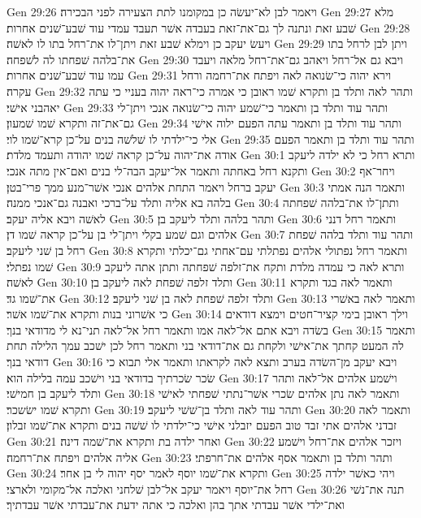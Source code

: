 Gen 29:26  ויאמר לבן לא־יעשׂה כן במקומנו לתת הצעירה לפני הבכירה׃
Gen 29:27  מלא שׁבע זאת ונתנה לך גם־את־זאת בעבדה אשׁר תעבד עמדי עוד שׁבע־שׁנים אחרות׃
Gen 29:28  ויעשׂ יעקב כן וימלא שׁבע זאת ויתן־לו את־רחל בתו לו לאשׁה׃
Gen 29:29  ויתן לבן לרחל בתו את־בלהה שׁפחתו לה לשׁפחה׃
Gen 29:30  ויבא גם אל־רחל ויאהב גם־את־רחל מלאה ויעבד עמו עוד שׁבע־שׁנים אחרות׃
Gen 29:31  וירא יהוה כי־שׂנואה לאה ויפתח את־רחמה ורחל עקרה׃
Gen 29:32  ותהר לאה ותלד בן ותקרא שׁמו ראובן כי אמרה כי־ראה יהוה בעניי כי עתה יאהבני אישׁי׃
Gen 29:33  ותהר עוד ותלד בן ותאמר כי־שׁמע יהוה כי־שׂנואה אנכי ויתן־לי גם־את־זה ותקרא שׁמו שׁמעון׃
Gen 29:34  ותהר עוד ותלד בן ותאמר עתה הפעם ילוה אישׁי אלי כי־ילדתי לו שׁלשׁה בנים על־כן קרא־שׁמו לוי׃
Gen 29:35  ותהר עוד ותלד בן ותאמר הפעם אודה את־יהוה על־כן קראה שׁמו יהודה ותעמד מלדת׃
Gen 30:1  ותרא רחל כי לא ילדה ליעקב ותקנא רחל באחתה ותאמר אל־יעקב הבה־לי בנים ואם־אין מתה אנכי׃
Gen 30:2  ויחר־אף יעקב ברחל ויאמר התחת אלהים אנכי אשׁר־מנע ממך פרי־בטן׃
Gen 30:3  ותאמר הנה אמתי בלהה בא אליה ותלד על־ברכי ואבנה גם־אנכי ממנה׃
Gen 30:4  ותתן־לו את־בלהה שׁפחתה לאשׁה ויבא אליה יעקב׃
Gen 30:5  ותהר בלהה ותלד ליעקב בן׃
Gen 30:6  ותאמר רחל דנני אלהים וגם שׁמע בקלי ויתן־לי בן על־כן קראה שׁמו דן׃
Gen 30:7  ותהר עוד ותלד בלהה שׁפחת רחל בן שׁני ליעקב׃
Gen 30:8  ותאמר רחל נפתולי אלהים נפתלתי עם־אחתי גם־יכלתי ותקרא שׁמו נפתלי׃
Gen 30:9  ותרא לאה כי עמדה מלדת ותקח את־זלפה שׁפחתה ותתן אתה ליעקב לאשׁה׃
Gen 30:10  ותלד זלפה שׁפחת לאה ליעקב בן׃
Gen 30:11  ותאמר לאה בגד ותקרא את־שׁמו גד׃
Gen 30:12  ותלד זלפה שׁפחת לאה בן שׁני ליעקב׃
Gen 30:13  ותאמר לאה באשׁרי כי אשׁרוני בנות ותקרא את־שׁמו אשׁר׃
Gen 30:14  וילך ראובן בימי קציר־חטים וימצא דודאים בשׂדה ויבא אתם אל־לאה אמו ותאמר רחל אל־לאה תני־נא לי מדודאי בנך׃
Gen 30:15  ותאמר לה המעט קחתך את־אישׁי ולקחת גם את־דודאי בני ותאמר רחל לכן ישׁכב עמך הלילה תחת דודאי בנך׃
Gen 30:16  ויבא יעקב מן־השׂדה בערב ותצא לאה לקראתו ותאמר אלי תבוא כי שׂכר שׂכרתיך בדודאי בני וישׁכב עמה בלילה הוא׃
Gen 30:17  וישׁמע אלהים אל־לאה ותהר ותלד ליעקב בן חמישׁי׃
Gen 30:18  ותאמר לאה נתן אלהים שׂכרי אשׁר־נתתי שׁפחתי לאישׁי ותקרא שׁמו ישׂשכר׃
Gen 30:19  ותהר עוד לאה ותלד בן־שׁשׁי ליעקב׃
Gen 30:20  ותאמר לאה זבדני אלהים אתי זבד טוב הפעם יזבלני אישׁי כי־ילדתי לו שׁשׁה בנים ותקרא את־שׁמו זבלון׃
Gen 30:21  ואחר ילדה בת ותקרא את־שׁמה דינה׃
Gen 30:22  ויזכר אלהים את־רחל וישׁמע אליה אלהים ויפתח את־רחמה׃
Gen 30:23  ותהר ותלד בן ותאמר אסף אלהים את־חרפתי׃
Gen 30:24  ותקרא את־שׁמו יוסף לאמר יסף יהוה לי בן אחר׃
Gen 30:25  ויהי כאשׁר ילדה רחל את־יוסף ויאמר יעקב אל־לבן שׁלחני ואלכה אל־מקומי ולארצי׃
Gen 30:26  תנה את־נשׁי ואת־ילדי אשׁר עבדתי אתך בהן ואלכה כי אתה ידעת את־עבדתי אשׁר עבדתיך׃
